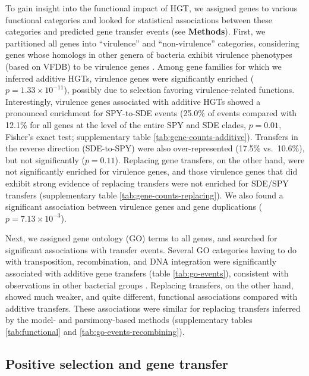 \documentclass[12pt]{article}
\begin{document}
To gain insight into the functional impact of HGT, we assigned genes to
various functional categories and looked for statistical associations
between these categories and predicted gene transfer events (see
\textbf{Methods}).  First, we partitioned all genes into ``virulence'' and
``non-virulence'' categories, considering genes whose homologs in other
genera of bacteria exhibit virulence phenotypes (based on VFDB) to be
virulence genes \citep[see][]{Suzuki2011}.  Among gene families for which
we inferred additive HGTs, virulence genes were significantly enriched
($p=1.33 \times 10^{-11}$), possibly due to selection favoring
virulence-related functions.  Interestingly, virulence genes associated
with additive HGTs showed a pronounced enrichment for SPY-to-SDE events
(25.0\% of events compared with 12.1\% for all genes at the level of the
entire SPY and SDE clades, $p=0.01$, Fisher's exact test; supplementary
table \ref{tab:gene-counts-additive}). 
Transfers in the reverse direction (SDE-to-SPY) were also over-represented
(17.5\% vs.\ 10.6\%), but not significantly ($p=0.11$).  Replacing gene
transfers, on the other hand, were not significantly enriched for virulence
genes, and those virulence genes that did exhibit strong evidence of
replacing transfers were not enriched for SDE/SPY transfers (supplementary
table \ref{tab:gene-counts-replacing}).  We also found a significant
association between virulence genes and gene duplications ($p=7.13 \times
10^{-3}$).  

Next, we assigned gene ontology (GO) terms to all genes, and searched for
significant associations with transfer events.  Several GO categories
having to do with transposition, recombination, and DNA integration were
significantly associated with additive gene transfers (table
\ref{tab:go-events}), consistent with observations in other bacterial
groups \citep[e.g.,][]{Liu2009}.  Replacing transfers, on the other hand,
showed much weaker, and quite different, functional associations compared with
additive transfers.  These associations were similar for replacing
transfers inferred by the model- and parsimony-based methods (supplementary
tables \ref{tab:functional} and \ref{tab:go-events-recombining}).


\subsection*{Positive selection and gene transfer}
\end{document}
